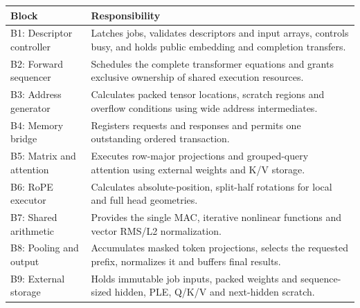 \documentclass[11pt,a4paper]{article}
\begin{document}
{\small\renewcommand{\arraystretch}{1.18}\begin{longtable}{@{}L{0.24\textwidth}|L{0.7\textwidth}@{}}\toprule

\textbf{Block} & \textbf{Responsibility}\\\midrule\endhead

B1: Descriptor controller & Latches jobs,\allowbreak{} validates descriptors and input arrays,\allowbreak{} controls busy,\allowbreak{} and holds public embedding and completion transfers.\\[2pt]\hline

B2: Forward sequencer & Schedules the complete transformer equations and grants exclusive ownership of shared execution resources.\\[2pt]\hline

B3: Address generator & Calculates packed tensor locations,\allowbreak{} scratch regions and overflow conditions using wide address intermediates.\\[2pt]\hline

B4: Memory bridge & Registers requests and responses and permits one outstanding ordered transaction.\\[2pt]\hline

B5: Matrix and attention & Executes row-major projections and grouped-query attention using external weights and K/\allowbreak{}V storage.\\[2pt]\hline

B6: RoPE executor & Calculates absolute-position,\allowbreak{} split-half rotations for local and full head geometries.\\[2pt]\hline

B7: Shared arithmetic & Provides the single MAC,\allowbreak{} iterative nonlinear functions and vector RMS/\allowbreak{}L2 normalization.\\[2pt]\hline

B8: Pooling and output & Accumulates masked token projections,\allowbreak{} selects the requested prefix,\allowbreak{} normalizes it and buffers final results.\\[2pt]\hline

B9: External storage & Holds immutable job inputs,\allowbreak{} packed weights and sequence-sized hidden,\allowbreak{} PLE,\allowbreak{} Q/\allowbreak{}K/\allowbreak{}V and next-hidden scratch.\\[2pt]\hline

\bottomrule\end{longtable}}
\end{document}
